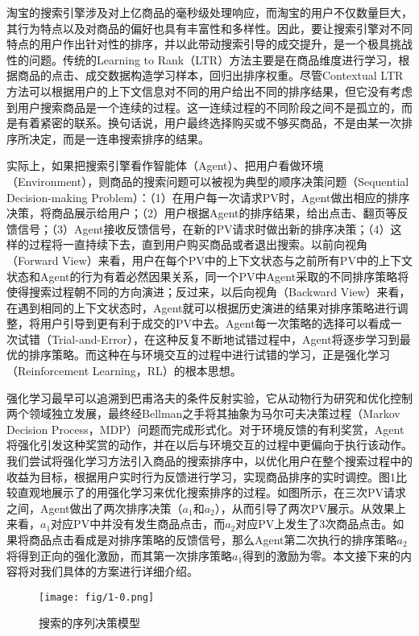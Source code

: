 淘宝的搜索引擎涉及对上亿商品的毫秒级处理响应，而淘宝的用户不仅数量巨大，其行为特点以及对商品的偏好也具有丰富性和多样性。因此，要让搜索引擎对不同特点的用户作出针对性的排序，并以此带动搜索引导的成交提升，是一个极具挑战性的问题。传统的Learning to Rank（LTR）方法主要是在商品维度进行学习，根据商品的点击、成交数据构造学习样本，回归出排序权重。尽管Contextual LTR方法可以根据用户的上下文信息对不同的用户给出不同的排序结果，但它没有考虑到用户搜索商品是一个连续的过程。这一连续过程的不同阶段之间不是孤立的，而是有着紧密的联系。换句话说，用户最终选择购买或不够买商品，不是由某一次排序所决定，而是一连串搜索排序的结果。

实际上，如果把搜索引擎看作智能体（Agent）、把用户看做环境（Environment），则商品的搜索问题可以被视为典型的顺序决策问题（Sequential Decision-making Problem）：（1）在用户每一次请求PV时，Agent做出相应的排序决策，将商品展示给用户；（2）用户根据Agent的排序结果，给出点击、翻页等反馈信号；（3）Agent接收反馈信号，在新的PV请求时做出新的排序决策；（4）这样的过程将一直持续下去，直到用户购买商品或者退出搜索。以前向视角（Forward View）来看，用户在每个PV中的上下文状态与之前所有PV中的上下文状态和Agent的行为有着必然因果关系，同一个PV中Agent采取的不同排序策略将使得搜索过程朝不同的方向演进；反过来，以后向视角（Backward View）来看，在遇到相同的上下文状态时，Agent就可以根据历史演进的结果对排序策略进行调整，将用户引导到更有利于成交的PV中去。Agent每一次策略的选择可以看成一次试错（Trial-and-Error），在这种反复不断地试错过程中，Agent将逐步学习到最优的排序策略。而这种在与环境交互的过程中进行试错的学习，正是强化学习（Reinforcement Learning，RL）的根本思想。

强化学习最早可以追溯到巴甫洛夫的条件反射实验，它从动物行为研究和优化控制两个领域独立发展，最终经Bellman之手将其抽象为马尔可夫决策过程（Markov Decision Process，MDP）问题而完成形式化。对于环境反馈的有利奖赏，Agent将强化引发这种奖赏的动作，并在以后与环境交互的过程中更偏向于执行该动作。我们尝试将强化学习方法引入商品的搜索排序中，以优化用户在整个搜索过程中的收益为目标，根据用户实时行为反馈进行学习，实现商品排序的实时调控。图1比较直观地展示了的用强化学习来优化搜索排序的过程。如图所示，在三次PV请求之间，Agent做出了两次排序决策（$a_1$和$a_2$），从而引导了两次PV展示。从效果上来看，$a_1$对应PV中并没有发生商品点击，而$a_2$对应PV上发生了3次商品点击。如果将商品点击看成是对排序策略的反馈信号，那么Agent第二次执行的排序策略$a_2$将得到正向的强化激励，而其第一次排序策略$a_1$得到的激励为零。本文接下来的内容将对我们具体的方案进行详细介绍。
\begin{figure}[!h]
\centering
\texttt{[image: fig/1-0.png]}
\caption{搜索的序列决策模型}
\end{figure}

